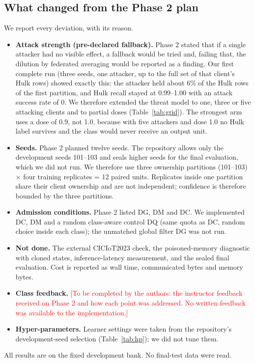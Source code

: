 \documentclass[10pt,a4paper]{article}
\begin{document}
\subsection{What changed from the Phase 2 plan}
We report every deviation, with its reason.
\begin{itemize}
\item \textbf{Attack strength (pre-declared fallback).} Phase 2 stated that if a single attacker had no visible effect, a fallback would be tried and, failing that, the dilution by federated averaging would be reported as a finding. Our first complete run (three seeds, one attacker, up to the full set of that client's Hulk rows) showed exactly this: the attacker held about 6\% of the Hulk rows of the first partition, and Hulk recall stayed at 0.99--1.00 with an attack success rate of 0. We therefore extended the threat model to one, three or five attacking clients and to partial doses (Table~\ref{tab:grid}). The strongest arm uses a dose of 0.9, not 1.0, because with five attackers and dose 1.0 no Hulk label survives and the class would never receive an output unit.
\item \textbf{Seeds.} Phase 2 planned twelve seeds. The repository allows only the development seeds 101--103 and seals higher seeds for the final evaluation, which we did not run. We therefore use three ownership partitions (101--103) $\times$ four training replicates = 12 paired units. Replicates inside one partition share their client ownership and are not independent; confidence is therefore bounded by the three partitions.
\item \textbf{Admission conditions.} Phase 2 listed DG, DM and DC. We implemented DC, DM and a random class-aware control DQ (same quota as DC, random choice inside each class); the unmatched global filter DG was not run.
\item \textbf{Not done.} The external CICIoT2023 check, the poisoned-memory diagnostic with cloned states, inference-latency measurement, and the sealed final evaluation. Cost is reported as wall time, communicated bytes and memory bytes.
\item \textbf{Class feedback.} \textcolor{red}{[To be completed by the authors: the instructor feedback received on Phase 2 and how each point was addressed. No written feedback was available to the implementation.]}
\item \textbf{Hyper-parameters.} Learner settings were taken from the repository's development-seed selection (Table~\ref{tab:hp}); we did not tune them.
\end{itemize}
All results are on the fixed development bank. No final-test data were read.
\end{document}
